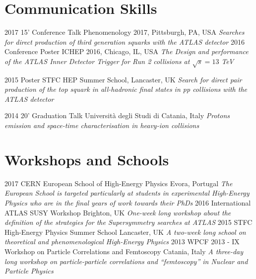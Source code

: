 \documentclass[print]{cv} %
\begin{document}
\section{Communication Skills}

\begin{entrylist}
  \entry
    {2017}
    {15' Conference Talk}
    {Phenomenology 2017, Pittsburgh, PA, USA}
    {\emph{Searches for direct production of third generation squarks with the ATLAS detector}}
  \entry
    {2016}
    {Conference Poster}
    {ICHEP 2016, Chicago, IL, USA}
    {\emph{The Design and performance of the ATLAS Inner Detector Trigger for Run 2 collisions at $\sqrt{s} = 13$ TeV}}

  \entry
    {2015}
    {Poster}
    {STFC HEP Summer School, Lancaster, UK}
    {\emph{Search for direct pair production of the top squark in all-hadronic final states in \emph{pp} collisions with the ATLAS detector}}

  \entry
    {2014}
    {20' Graduation Talk}
    {Università degli Studi di Catania, Italy}
    {\emph{Protons emission and space-time characterisation in heavy-ion collisions}}
\end{entrylist}

\section{Workshops and Schools}

\begin{entrylist}
  \entry
    {2017}
    {CERN European School of High-Energy Physics}
    {Evora, Portugal}
    {\emph{The European School is targeted particularly at students in experimental High-Energy Physics who are in the final years of work towards their PhDs}}
  \entry
    {2016}
    {International ATLAS SUSY Workshop}
    {Brighton, UK}
    {\emph{One-week long workshop about the definition of the strategies for the Supersymmetry searches at ATLAS}}
  \entry
    {2015}
    {STFC High-Energy Physics Summer School}
    {Lancaster, UK}
    {\emph{A two-week long school on theoretical and phenomenological High-Energy Physics}}
  \entry
    {2013}
    {WPCF 2013 - IX Workshop on Particle Correlations and Femtoscopy}
    {Catania, Italy}
    {\emph{A three-day long workshop on particle-particle correlations and “femtoscopy” in Nuclear and Particle Physics}}
\end{entrylist}
\end{document}
